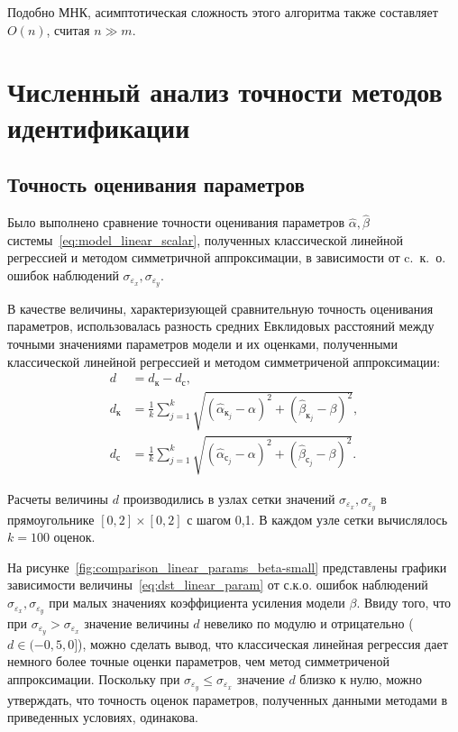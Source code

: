 Подобно МНК, асимптотическая сложность этого алгоритма также составляет \( O(n) \),
считая \( n \gg m \).


\section{Численный анализ точности методов идентификации}

\subsection{Точность оценивания параметров}

Было выполнено сравнение точности оценивания параметров
\( \hat{\alpha}, \hat{\beta} \) системы~\eqref{eq:model_linear_scalar},
полученных классической линейной регрессией и методом симметричной аппроксимации,
в зависимости от c.~к.~о. ошибок наблюдений \( \sigma_{\varepsilon_x}, \sigma_{\varepsilon_y} \).

В качестве величины, характеризующей сравнительную точность оценивания параметров,
использовалась разность средних Евклидовых расстояний
между точными значениями параметров модели и их оценками,
полученными классической линейной регрессией и методом симметриченой аппроксимации:
\begin{equation}
  \begin{aligned}
    d &= d_{\text{к}} - d_{\text{с}}, \\
    d_{\text{к}} &= \frac{1}{k} \sum_{j=1}^k \sqrt{(\hat{\alpha}_{\text{к}_j} - \alpha)^2 + (\hat{\beta}_{\text{к}_j} - \beta)^2}, \\
    d_{\text{с}} &= \frac{1}{k} \sum_{j=1}^k \sqrt{(\hat{\alpha}_{\text{с}_j} - \alpha)^2 + (\hat{\beta}_{\text{с}_j} - \beta)^2}.
    \end{aligned}
  \label{eq:dst_linear_param}
\end{equation}

Расчеты величины \( d \) производились в узлах сетки значений
\( \sigma_{\varepsilon_x}, \sigma_{\varepsilon_y} \) в прямоугольнике
\( [0, 2] \times [0, 2] \) с шагом 0{,}1.
В каждом узле сетки вычислялось \( k = 100 \) оценок.

На рисунке~\ref{fig:comparison_linear_params_beta-small}
представлены графики зависимости величины~\eqref{eq:dst_linear_param}
от с.к.о. ошибок наблюдений \( \sigma_{\varepsilon_x}, \sigma_{\varepsilon_y} \) при
малых значениях коэффициента усиления модели \( \beta \).
Ввиду того, что при \( \sigma_{\varepsilon_y} > \sigma_{\varepsilon_x} \)
значение величины \( d \) невелико по модулю и отрицательно (\( d \in ( -0{,}5, 0 ] \)),
можно сделать вывод, что классическая линейная регрессия дает немного более точные оценки параметров,
чем метод симметриченой аппроксимации.
Поскольку при \( \sigma_{\varepsilon_y} \le \sigma_{\varepsilon_x} \) значение
\( d \) близко к нулю, можно утверждать, что точность оценок параметров,
полученных данными методами в приведенных условиях, одинакова.

